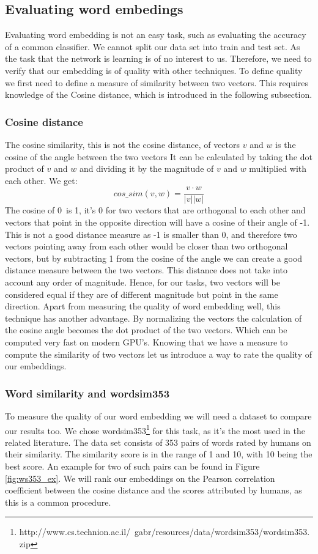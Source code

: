 \documentclass[conference]{IEEEtran}
\begin{document}
\subsection{Evaluating word embedings}
Evaluating word embedding is not an easy task, such as evaluating the accuracy of a common classifier. We cannot split our data set into train and test set. As the task that the network is learning is of no interest to us. Therefore, we need to verify that our embedding is of quality with other techniques. To define quality we first need to define a measure of similarity between two vectors. This requires knowledge of the Cosine distance, which is introduced in the following subsection.
\subsubsection{Cosine distance}
The cosine similarity, this is not the cosine distance, of vectors $v$ and $w$ is the cosine of the angle between the two vectors It can be calculated by taking the dot product of $v$ and $w$ and dividing it by the magnitude of $v$ and $w$ multiplied with each other. We get:
\begin{equation}
cos\_sim(v,w) = \frac{v \cdot w}{|v| |w|}
\end{equation}
The cosine of 0\textdegree ~is 1, it's 0 for two vectors that are orthogonal to each other and vectors that point in the opposite direction will have a cosine of their angle of -1. This is not a good distance measure as -1 is smaller than 0, and therefore two vectors pointing away from each other would be closer than two orthogonal vectors, but by subtracting 1 from the cosine of the angle we can create a good distance measure between the two vectors. This distance does not take into account any order of magnitude. Hence, for our tasks, two vectors will be considered equal if they are of different magnitude but point in the same direction.
Apart from measuring the quality of word embedding well, this technique has another advantage. By normalizing the vectors the calculation of the cosine angle becomes the dot product of the two vectors. Which can be computed very fast on modern GPU's.
Knowing that we have a measure to compute the similarity of two vectors let us introduce a way to rate the quality of our embeddings.

\subsubsection{Word similarity and wordsim353}
To measure the quality of our word embedding we will need a dataset to compare our results too. We chose wordsim353\footnote{http://www.cs.technion.ac.il/~gabr/resources/data/wordsim353/wordsim353.zip} for this task, as it's the most used in the related literature. The data set consists of 353 pairs of words rated by humans on their similarity. The similarity score is in the range of 1 and 10, with 10 being the best score. An example for two of such pairs can be found in Figure \ref{fig:ws353_ex}. We will rank our embeddings on the Pearson correlation coefficient between the cosine distance and the scores attributed by humans, as this is a common procedure.
\end{document}
